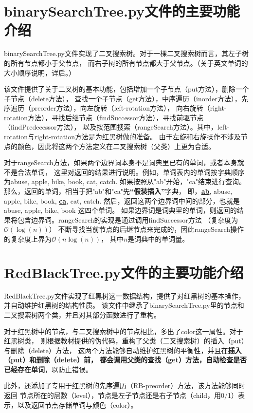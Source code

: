\documentclass{article}
\begin{document}
\section{binarySearchTree.py文件的主要功能介绍}
binarySearchTree.py文件实现了二叉搜索树。对于一棵二叉搜索树而言，其左子树的所有节点都小于父节点，
而右子树的所有节点都大于父节点。（关于英文单词的大小顺序说明，详后。）

该文件提供了关于二叉树的基本功能，包括增加一个子节点（put方法），删除一个子节点（delete方法），
查找一个子节点（get方法），中序遍历（inorder方法），先序遍历（preorder方法），向左旋转（left-rotation方法），
向右旋转（right-rotation方法），寻找后继节点（findSuccessor方法），寻找前驱节点（findPredecessor方法），
以及按范围搜索（rangeSearch方法）。其中，left-rotation与right-rotation方法是为红黑树做的准备。
由于左旋和右旋操作不涉及节点的颜色，因此将这两个方法定义在二叉搜索树（父类）上更为合适。

对于rangeSearch方法，如果两个边界词本身不是词典里已有的单词，或者本身就不是合法单词，
这里对返回的结果进行说明。例如，单词表内的单词按字典顺序为abuse, apple, bike, book, cat, catch. 
如果按照从"ab"开始，"ca"结束进行查询。那么，返回的单词，相当于把"ab"和"ca"先\textbf{“假装插入”}字典，
即，\underline{\textbf{ab}}, abuse, apple, bike, book, \underline{\textbf{ca}}, cat, catch. 
然后，返回这两个边界词中间的部分，也就是abuse, apple, bike, book 这四个单词。
如果边界词是词典里的单词，则返回的结果将包含边界词。rangeSearch的实现是通过调用findSuccessor方法
（复杂度为$\mathcal{O} (\log(n))$）
不断寻找当前节点的后继节点来完成的，因此rangeSearch操作的复杂度上界为$\mathcal{O} (n\log(n))$，
其中$n$是词典中的单词量。


\section{RedBlackTree.py文件的主要功能介绍}
RedBlackTree.py文件实现了红黑树这一数据结构，提供了对红黑树的基本操作，并自动维护红黑树的结构性质。
该文件中继承了binarySearchTree.py里的节点和二叉搜索树两个类，并且对其部分函数进行了重构。

对于红黑树中的节点，与二叉搜索树中的节点相比，多出了color这一属性。对于红黑树类，
则根据教材提供的伪代码，重构了父类（二叉搜索树）的插入（put）与删除（delete）方法，
这两个方法能够自动维护红黑树的平衡性，并且在\textbf{插入（put）和删除（delete）前，
都会调用父类的查找（get）方法，自动检查是否已经存在单词}，以防止错误。

此外，还添加了专用于红黑树的先序遍历（RB-preorder）方法，该方法能够同时返回
节点所在的层数（level），节点是左子节点还是右子节点（child，用0/1）表示，以及返回节点存储单词与颜色（color）。
\end{document}
